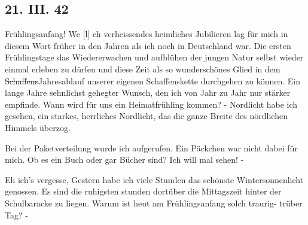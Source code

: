 \subsection{21. III. 42}

Fr\"{u}hlingsanfang!
We{\color{red} [l] }ch verheissendes heimliches Jubilieren lag f\"{u}r mich in diesem Wort fr\"{u}her in den Jahren als ich noch in Deutschland war.
Die ersten Fr\"{u}hlingstage das Wiedererwachen und aufbl\"{u}hen der jungen Natur selbst wieder einmal erleben zu d\"{u}rfen und diese Zeit als so wundersch\"{o}nes Glied in dem \st{Schaffens}Jahresablauf unserer eigenen Schaffenskette durchgehen zu k\"{o}nnen.
Ein lange Jahre sehnlichst gehegter Wunsch, den ich von Jahr zu Jahr nur st\"{a}rker empfinde.
Wann wird f\"{u}r uns ein Heimatfr\"{u}hling kommen?
- Nordlicht habe ich gesehen, ein starkes, herrliches Nordlicht, das die ganze Breite des n\"{o}rdlichen Himmels \"{u}berzog.

Bei der Paketverteilung wurde ich aufgerufen.
Ein P\"{a}ckchen war nicht dabei f\"{u}r mich.
Ob es ein Buch oder gar B\"{u}cher sind?
Ich will mal sehen! -

Eh ich's vergesse, Gestern habe ich viele Stunden das sch\"{o}nste Wintersonnenlicht genossen.
Es sind die ruhigsten stunden dort\"{u}ber die Mittagszeit hinter der Schulbaracke zu liegen.
Warum ist heut am Fr\"{u}hlingsanfang solch traurig- tr\"{u}ber Tag? -

\clearpage
